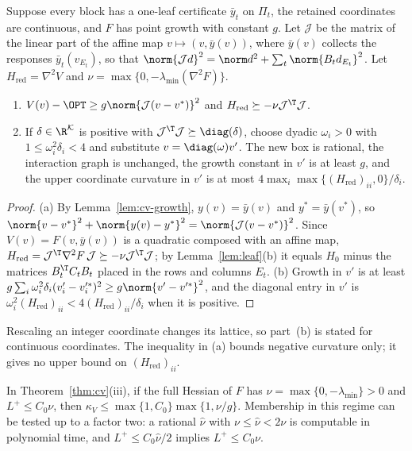 \begin{corollary}\label{cor:cv-affine}
Suppose every block has a one-leaf certificate $\bar y_t$ on $\Pi_t$, the
retained coordinates are continuous, and $F$ has point growth with
constant $g$. Let $\mathcal J$ be the matrix of the linear part of the affine
map $v\mapsto(v,\bar y(v))$, where $\bar y(v)$ collects the responses
$\bar y_t(v_{E_t})$, so that
$\norm{\mathcal Jd}^2=\norm d^2+\sum_t\norm{B_td_{E_t}}^2$. Let
$H_{\mathrm{red}}=\nabla^2V$ and $\nu=\max\{0,-\lambda_{\min}(\nabla^2F)\}$.
\begin{enumerate}
\item[(a)] $V(v)-\OPT\ge g\norm{\mathcal J(v-v^*)}^2$ and
$H_{\mathrm{red}}\succeq-\nu\mathcal J^{\T}\mathcal J$.
\item[(b)] If $\delta\in\R^{\mathcal K}$ is positive with
$\mathcal J^{\T}\mathcal J\succeq\diag(\delta)$, choose dyadic $\omega_i>0$
with $1\le\omega_i^2\delta_i<4$ and substitute $v=\diag(\omega)v'$. The new
box is rational, the interaction graph is unchanged, the growth constant in
$v'$ is at least $g$, and the upper coordinate curvature in $v'$ is at most
$4\max_i\max\{(H_{\mathrm{red}})_{ii},0\}/\delta_i$.
\end{enumerate}
\end{corollary}

\begin{proof}
(a) By Lemma~\ref{lem:cv-growth}, $y(v)=\bar y(v)$ and $y^*=\bar y(v^*)$,
so $\norm{v-v^*}^2+\norm{y(v)-y^*}^2=\norm{\mathcal J(v-v^*)}^2$. Since
$V(v)=F(v,\bar y(v))$ is a quadratic composed with an affine map,
$H_{\mathrm{red}}=\mathcal J^{\T}\nabla^2F\,\mathcal J\succeq-\nu\mathcal J^{\T}\mathcal J$;
by Lemma~\ref{lem:leaf}(b) it equals $H_0$ minus the matrices
$B_t^{\T}C_tB_t$ placed in the rows and columns $E_t$. (b) Growth in $v'$
is at least $g\sum_i\omega_i^2\delta_i(v'_i-v'^*_i)^2\ge g\norm{v'-v'^*}^2$,
and the diagonal entry in $v'$ is
$\omega_i^2(H_{\mathrm{red}})_{ii}<4(H_{\mathrm{red}})_{ii}/\delta_i$ when it
is positive.
\end{proof}

Rescaling an integer coordinate changes its lattice, so part~(b) is stated
for continuous coordinates. The inequality in (a) bounds negative curvature
only; it gives no upper bound on $(H_{\mathrm{red}})_{ii}$.

\begin{corollary}\label{cor:cv-nu}
In Theorem~\ref{thm:cv}(iii), if the full Hessian of $F$ has
$\nu=\max\{0,-\lambda_{\min}\}>0$ and $L^+\le C_0\nu$, then
$\kappa_V\le\max\{1,C_0\}\max\{1,\nu/g\}$. Membership in this regime can be
tested up to a factor two: a rational $\hat\nu$ with $\nu\le\hat\nu<2\nu$ is
computable in polynomial time, and $L^+\le C_0\hat\nu/2$ implies
$L^+\le C_0\nu$.
\end{corollary}

